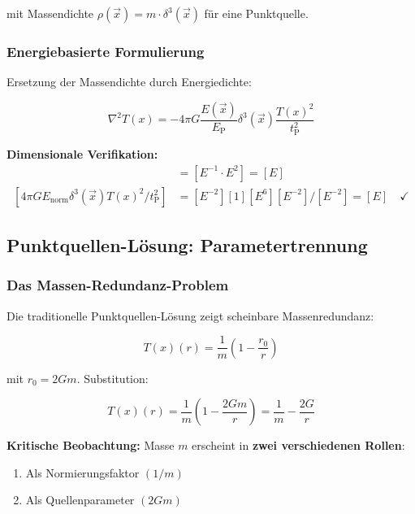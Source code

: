 \documentclass[12pt,a4paper]{article}
\newcommand{\Tfield}{T(x)}
\newcommand{\vecx}{\vec{x}}
\newcommand{\tP}{t_{\text{P}}}
\newcommand{\EP}{E_{\text{P}}}
\begin{document}
	mit Massendichte $\rho(\vecx) = m \cdot \delta^3(\vecx)$ für eine Punktquelle.
	
	\subsubsection{Energiebasierte Formulierung}
	
	Ersetzung der Massendichte durch Energiedichte:
	
	\begin{equation}
		\boxed{\nabla^2 \Tfield = -4\pi G \frac{E(\vecx)}{\EP} \delta^3(\vecx) \frac{\Tfield^2}{\tP^2}}
		\label{eq:field_equation_mass_free}
	\end{equation}
	
	\textbf{Dimensionale Verifikation:}
	\begin{align}
		[\nabla^2 \Tfield] &= [E^{-1} \cdot E^2] = [E] \\
		[4\pi G E_{\text{norm}} \delta^3(\vecx) \Tfield^2/\tP^2] &= [E^{-2}][1][E^6][E^{-2}]/[E^{-2}] = [E] \quad \checkmark
	\end{align}
	
	\subsection{Punktquellen-Lösung: Parametertrennung}
	\label{subsec:point_source_elimination}
	
	\subsubsection{Das Massen-Redundanz-Problem}
	
	Die traditionelle Punktquellen-Lösung zeigt scheinbare Massenredundanz:
	
	\begin{equation}
		\Tfield(r) = \frac{1}{m}\left(1 - \frac{r_0}{r}\right)
		\label{eq:point_source_original}
	\end{equation}
	
	mit $r_0 = 2Gm$. Substitution:
	
	\begin{equation}
		\Tfield(r) = \frac{1}{m}\left(1 - \frac{2Gm}{r}\right) = \frac{1}{m} - \frac{2G}{r}
		\label{eq:mass_redundancy}
	\end{equation}
	
	\textbf{Kritische Beobachtung:} Masse $m$ erscheint in \textbf{zwei verschiedenen Rollen}:
	\begin{enumerate}
		\item Als Normierungsfaktor $(1/m)$
		\item Als Quellenparameter $(2Gm)$
	\end{enumerate}
	
\end{document}
